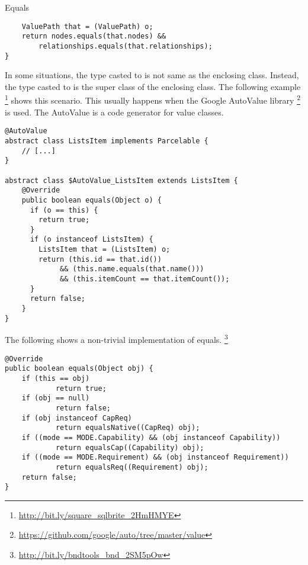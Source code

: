 \begin{pattern}{Equals}
\begin{verbatim}
    ValuePath that = (ValuePath) o;
    return nodes.equals(that.nodes) &&
        relationships.equals(that.relationships);
}
\end{verbatim}

In some situations, the type casted to is not same as the enclosing class.
Instead, the type casted to is the super class of the enclosing class.
The following example%
\footnote{\url{http://bit.ly/square_sqlbrite_2HmHMYE}}
shows this scenario.
This usually happens when the Google AutoValue library%
\footnote{\url{https://github.com/google/auto/tree/master/value}}
is used.
The AutoValue is a code generator for value classes.

\begin{verbatim}
@AutoValue
abstract class ListsItem implements Parcelable {
    // [...]
}

abstract class $AutoValue_ListsItem extends ListsItem {
    @Override
    public boolean equals(Object o) {
      if (o == this) {
        return true;
      }
      if (o instanceof ListsItem) {
        ListsItem that = (ListsItem) o;
        return (this.id == that.id())
             && (this.name.equals(that.name()))
             && (this.itemCount == that.itemCount());
      }
      return false;
    }
}
\end{verbatim}

The following shows a non-trivial implementation of equals.
\footnote{\url{http://bit.ly/bndtools_bnd_2SM5pOw}}

\begin{verbatim}
@Override
public boolean equals(Object obj) {
    if (this == obj)
            return true;
    if (obj == null)
            return false;
    if (obj instanceof CapReq)
            return equalsNative((CapReq) obj);
    if ((mode == MODE.Capability) && (obj instanceof Capability))
            return equalsCap((Capability) obj);
    if ((mode == MODE.Requirement) && (obj instanceof Requirement))
            return equalsReq((Requirement) obj);
    return false;
}
\end{verbatim}


\end{pattern}
